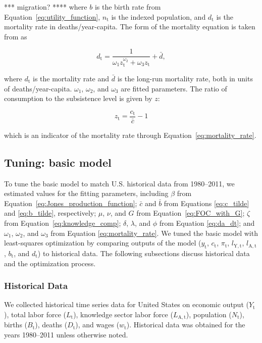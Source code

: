 \documentclass[letterpaper,12pt]{article}
\begin{document}
\noindent **** migration? **** where $b$ is the birth rate from Equation~\ref{eq:utility_function}, $n_\mathrm{t}$ is the indexed population, and $d_\mathrm{t}$ is the mortality rate in deaths/year-capita. The form of the mortality equation is taken from \citet{Jones:2001wn} as

\begin{equation} \label{eq:mortality_rate}
	d_\mathrm{t} = \frac{1}{\omega_\mathrm{1} z_\mathrm{t}^{\omega_\mathrm{2}} + \omega_\mathrm{3} z_\mathrm{t}} + \bar d,
\end{equation}

\noindent where $d_\mathrm{t}$ is the mortality rate and $\bar d$ is the long-run mortality rate, both in units of deaths/year-capita. $\omega_\mathrm{1}$, $\omega_\mathrm{2}$, and $\omega_\mathrm{3}$ are fitted parameters. The ratio of consumption to the subsistence level is given by $z$:

\begin{equation} \label{eq:z}
	z_\mathrm{t} = \frac{c_\mathrm{t}}{\bar c} - 1
\end{equation}

\noindent which is an indicator of the mortality rate through Equation~\ref{eq:mortality_rate}.

\subsection{Tuning: basic model}
\label{sec:Tuning_basic_model}

To tune the basic model to match U.S. historical data from 1980--2011, we estimated values for the fitting parameters, including $\beta$ from Equation~\ref{eq:Jones_production_function}; $\bar c$ and $\bar b$ from Equations \ref{eq:c_tilde} and \ref{eq:b_tilde}, respectively; $\mu$, $\nu$, and $G$ from Equation~\ref{eq:FOC_with_G}; $\zeta$ from Equation~\ref{eq:knowledge_comp}; $\delta$, $\lambda$, and $\phi$ from Equation \ref{eq:da_dt}; and $\omega_1$, $\omega_2$, and $\omega_3$ from Equation \ref{eq:mortality_rate}. We tuned the basic model with least-squares optimization by comparing outputs of the model ($y_\mathrm{t}$, $c_\mathrm{t}$, $\pi_\mathrm{t}$, $l_\mathrm{Y,t}$, $l_\mathrm{A,t}$, $b_{\mathrm{t}}$, and $d_\mathrm{t}$) to historical data. The following subsections discuss historical data and the optimization process.

\subsubsection{Historical Data}
We collected historical time series data for United States on economic output ($Y_\mathrm{t}$), total labor force ($L_\mathrm{t}$), knowledge sector labor force ($L_\mathrm{A,t}$), population ($N_\mathrm{t}$), births ($B_\mathrm{t}$), deaths ($D_\mathrm{t}$), and wages ($w_\mathrm{t}$). Historical data was obtained for the years 1980--2011 unless otherwise noted. 
\end{document}
